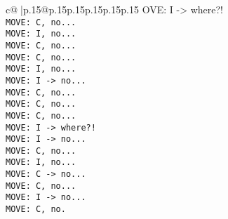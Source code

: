 \documentclass{article}
\begin{document}
{\begin{supertabular}{c@{$\;$}|p{.15\linewidth}@{}p{.15\linewidth}p{.15\linewidth}p{.15\linewidth}p{.15\linewidth}p{.15\linewidth}}
{{{OVE: I -> where?!\\ \tt  MOVE: C, no...\\ \tt  MOVE: I, no...\\ \tt  MOVE: C, no...\\ \tt  MOVE: C, no...\\ \tt  MOVE: I, no...\\ \tt  MOVE: I -> no...\\ \tt  MOVE: C, no...\\ \tt  MOVE: C, no...\\ \tt  MOVE: C, no...\\ \tt  MOVE: I -> where?!\\ \tt  MOVE: I -> no...\\ \tt  MOVE: C, no...\\ \tt  MOVE: I, no...\\ \tt  MOVE: C -> no...\\ \tt  MOVE: C, no...\\ \tt  MOVE: I -> no...\\ \tt  MOVE: C, no.}}}
\end{supertabular}}
\end{document}
